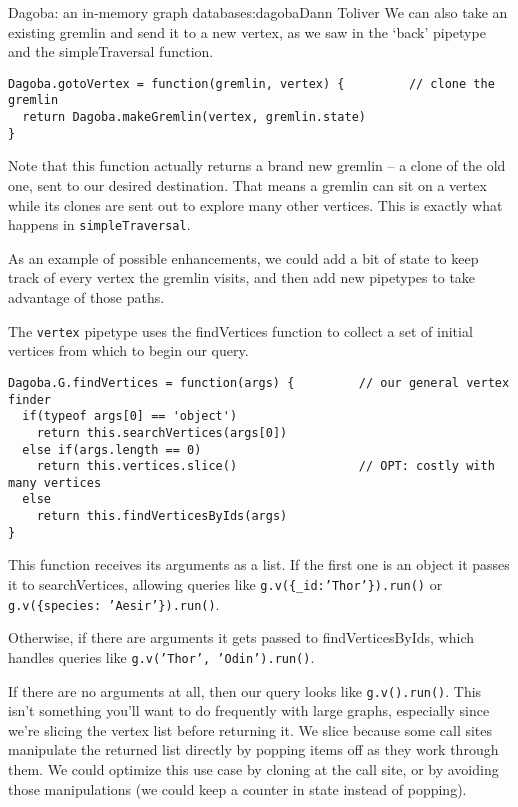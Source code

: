 \begin{aosachapter}{Dagoba: an in-memory graph database}{s:dagoba}{Dann Toliver}
We can also take an existing gremlin and send it to a new vertex, as we
saw in the `back' pipetype and the simpleTraversal function.

\begin{verbatim}
Dagoba.gotoVertex = function(gremlin, vertex) {         // clone the gremlin 
  return Dagoba.makeGremlin(vertex, gremlin.state)
}
\end{verbatim}

Note that this function actually returns a brand new gremlin -- a clone
of the old one, sent to our desired destination. That means a gremlin
can sit on a vertex while its clones are sent out to explore many other
vertices. This is exactly what happens in \texttt{simpleTraversal}.

As an example of possible enhancements, we could add a bit of state to
keep track of every vertex the gremlin visits, and then add new
pipetypes to take advantage of those paths.

\label{finding}

The \texttt{vertex} pipetype uses the findVertices function to collect a
set of initial vertices from which to begin our query.

\begin{verbatim}
Dagoba.G.findVertices = function(args) {         // our general vertex finder
  if(typeof args[0] == 'object')
    return this.searchVertices(args[0])
  else if(args.length == 0)
    return this.vertices.slice()                 // OPT: costly with many vertices
  else
    return this.findVerticesByIds(args)
}
\end{verbatim}

This function receives its arguments as a list. If the first one is an
object it passes it to searchVertices, allowing queries like
\texttt{g.v(\{\_id:'Thor'\}).run()} or
\texttt{g.v(\{species: 'Aesir'\}).run()}.

Otherwise, if there are arguments it gets passed to findVerticesByIds,
which handles queries like \texttt{g.v('Thor', 'Odin').run()}.

If there are no arguments at all, then our query looks like
\texttt{g.v().run()}. This isn't something you'll want to do frequently
with large graphs, especially since we're slicing the vertex list before
returning it. We slice because some call sites manipulate the returned
list directly by popping items off as they work through them. We could
optimize this use case by cloning at the call site, or by avoiding those
manipulations (we could keep a counter in state instead of popping).


\end{aosachapter}
